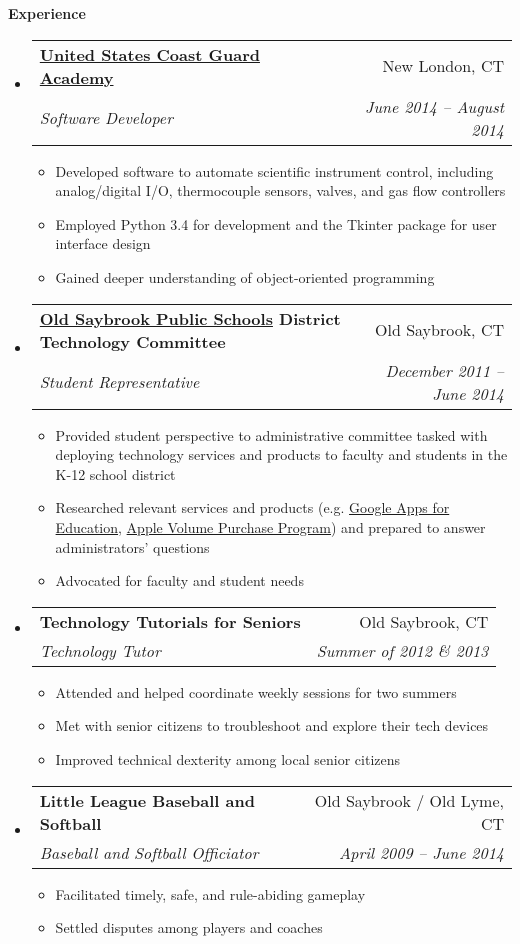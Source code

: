 \documentclass[letterpaper,10pt]{article}
\makeatletter
\newcommand{\resitem}[1]{\item #1 \vspace{-2pt}}
\newcommand{\resheading}[1]{{\large \colorbox{mygrey}{\begin{minipage}{\textwidth}{\textbf{#1 \vphantom{p\^{E}}}}\end{minipage}}}}
\newcommand{\ressubheading}[4]{
\begin{tabular*}{6.8in}{l@{\extracolsep{\fill}}r}
		\textbf{#1} & #2 \\
		\textit{#3} & \textit{#4} \\
\end{tabular*}\vspace{-6pt}}
\makeatother
\begin{document}
\resheading{Experience}
	\begin{itemize}[leftmargin=*]
		\item[] 
			\ressubheading{\href{http://www.uscga.edu}{United States Coast Guard Academy}}{New London, CT}
				{Software Developer}{June 2014 -- August 2014}
				{ \footnotesize
				\begin{itemize}
					\resitem{Developed software to automate scientific instrument control, including analog/digital I/O, thermocouple sensors, valves, and gas flow controllers}
					\resitem{Employed Python 3.4 for development and the Tkinter package for user interface design}
					\resitem{Gained deeper understanding of object-oriented programming}
				\end{itemize}
				}
		\item[]
			\ressubheading{\href{http://www.oldsaybrook.k12.ct.us}{Old Saybrook Public Schools} District Technology Committee}{Old Saybrook, CT}
				{Student Representative}{December 2011 --  June 2014}
				{\footnotesize
				\begin{itemize}
					\resitem{Provided student perspective to administrative committee tasked with deploying technology services and products to faculty and students in the K-12 school district}
					\resitem{Researched relevant services and products (e.g. \href{https://www.google.com/work/apps/education/}{Google Apps for Education}, \href{http://www.apple.com/education/it/vpp/}{Apple Volume Purchase Program}) and prepared to answer administrators' questions}
					\resitem{Advocated for faculty and student needs}
				\end{itemize}}
		\item[]
			\ressubheading{Technology Tutorials for Seniors}{Old Saybrook, CT}
				{Technology Tutor}{Summer of 2012 \& 2013}
				{\footnotesize 
				\begin{itemize}
					\resitem{Attended and helped coordinate weekly sessions for two summers}
					\resitem{Met with senior citizens to troubleshoot and explore their tech devices}
					\resitem{Improved technical dexterity among local senior citizens}
				\end{itemize}}
		\item[]
			\ressubheading{Little League Baseball and Softball}{Old Saybrook / Old Lyme, CT}
						{Baseball and Softball Officiator}{April 2009 -- June 2014}
				{\footnotesize
				\begin{itemize}
					\resitem{Facilitated timely, safe, and rule-abiding gameplay}
					\resitem{Settled disputes among players and coaches}
				\end{itemize}}
	\end{itemize}  %
\end{document}
